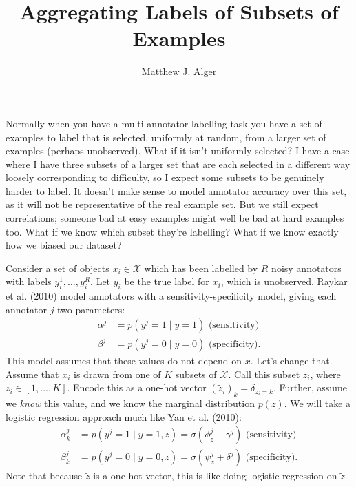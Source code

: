 \documentclass[a4paper]{article}
\begin{document}
    \title{Aggregating Labels of Subsets of Examples}
    \author{Matthew J. Alger}
    \maketitle

    Normally when you have a multi-annotator labelling task you have a set of examples to label that is selected, uniformly at random, from a larger set of examples (perhaps unobserved). What if it isn't uniformly selected? I have a case where I have three subsets of a larger set that are each selected in a different way loosely corresponding to difficulty, so I expect some subsets to be genuinely harder to label. It doesn't make sense to model annotator accuracy over this set, as it will not be representative of the real example set. But we still expect correlations; someone bad at easy examples might well be bad at hard examples too. What if we know which subset they're labelling? What if we know exactly how we biased our dataset?

    Consider a set of objects $x_i \in \mathcal X$ which has been labelled by $R$ noisy annotators with labels $y^1_i, \dots, y^R_i$. Let $y_i$ be the true label for $x_i$, which is unobserved. Raykar et al. (2010) model annotators with a sensitivity-specificity model, giving each annotator $j$ two parameters:
    \begin{align}
        \alpha^j &= p(y^j = 1 \mid y = 1)\text{ (sensitivity)}\\
        \beta^j &= p(y^j = 0 \mid y = 0)\text{ (specificity)}.
    \end{align}
    This model assumes that these values do not depend on $x$. Let's change that. Assume that $x_i$ is drawn from one of $K$ subsets of $\mathcal X$. Call this subset $z_i$, where $z_i \in [1, \dots, K]$. Encode this as a one-hot vector $(\tilde z_i)_k = \delta_{z_i = k}$. Further, assume we \emph{know} this value, and we know the marginal distribution $p(z)$. We will take a logistic regression approach much like Yan et al. (2010):
    \begin{align}
        \alpha^j_k &= p(y^j = 1 \mid y = 1, z) = \sigma(\phi_{z}^j + \gamma^j) \text{ (sensitivity)}\\
        \beta^j_k &= p(y^j = 0 \mid y = 0, z) = \sigma(\psi_{z}^j + \delta^j) \text{ (specificity)}.
    \end{align}
    Note that because $\tilde z$ is a one-hot vector, this is like doing logistic regression on $\tilde z$.
\end{document}
